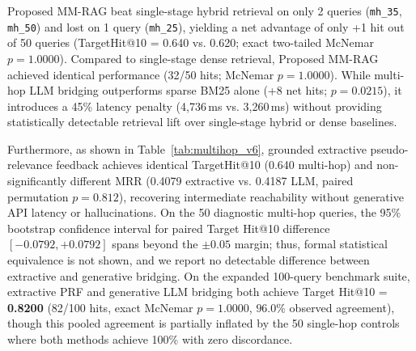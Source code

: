 \documentclass[conference]{IEEEtran}
\begin{document}
\begin{table}[htbp]
\centering
\small
\caption{Exact paired discordant case analysis and two-tailed McNemar tests across the 50 diagnostic multi-hop queries. Comparison of Proposed Multi-Hop LLM Bridging against Single-Stage Hybrid, Single-Stage Dense, and Sparse BM25 baselines. While LLM bridging outperforms sparse BM25 alone (+8 net hits, $p = 0.0215$), it yields no statistically detectable retrieval improvement over single-stage hybrid (+1 net hit, $p = 1.000$) or single-stage dense (identical 32/50 hits, $p = 1.000$).}
\label{tab:multihop_paired_v3}
\end{table}

Proposed MM-RAG beat single-stage hybrid retrieval on only 2 queries (\texttt{mh\_35}, \texttt{mh\_50}) and lost on 1 query (\texttt{mh\_25}), yielding a net advantage of only +1 hit out of 50 queries (TargetHit@10 = 0.640 vs. 0.620; exact two-tailed McNemar $p = 1.0000$). Compared to single-stage dense retrieval, Proposed MM-RAG achieved identical performance (32/50 hits; McNemar $p = 1.0000$). While multi-hop LLM bridging outperforms sparse BM25 alone (+8 net hits; $p = 0.0215$), it introduces a 45\% latency penalty (4,736\,ms vs. 3,260\,ms) without providing statistically detectable retrieval lift over single-stage hybrid or dense baselines.

Furthermore, as shown in Table~\ref{tab:multihop_v6}, grounded extractive pseudo-relevance feedback achieves identical TargetHit@10 (0.640 multi-hop) and non-significantly different MRR (0.4079 extractive vs. 0.4187 LLM, paired permutation $p = 0.812$), recovering intermediate reachability without generative API latency or hallucinations. On the 50 diagnostic multi-hop queries, the 95\% bootstrap confidence interval for paired Target Hit@10 difference $[-0.0792, +0.0792]$ spans beyond the $\pm 0.05$ margin; thus, formal statistical equivalence is not shown, and we report no detectable difference between extractive and generative bridging. On the expanded 100-query benchmark suite, extractive PRF and generative LLM bridging both achieve Target Hit@10 = \textbf{0.8200} (82/100 hits, exact McNemar $p = 1.0000$, $96.0\%$ observed agreement), though this pooled agreement is partially inflated by the 50 single-hop controls where both methods achieve 100\% with zero discordance.
\end{document}

